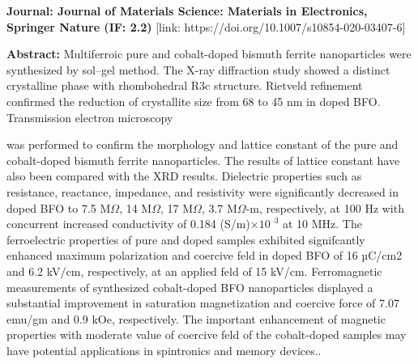 \documentclass[a4paper,20pt]{article}
\begin{document}
\textbf{Journal: Journal of Materials Science: Materials in Electronics, Springer Nature (IF: 2.2)} [link: https://doi.org/10.1007/s10854-020-03407-6] \\ \vspace{10pt}

\textbf{Abstract:} Multiferroic pure and cobalt-doped bismuth ferrite nanoparticles were synthesized by sol–gel method. The X-ray diffraction study showed a distinct crystalline phase with rhombohedral R3c structure. Rietveld refinement confirmed the reduction of crystallite size from 68 to 45 nm in doped BFO. Transmission electron microscopy \\ \vspace{2pt}

    \begin{minipage}{.59\linewidth} \begin{flushleft}
    
    	  was performed to confirm the morphology and lattice constant of the pure and cobalt-doped bismuth ferrite nanoparticles. The results of lattice constant have also been compared with the XRD results. Dielectric properties such as resistance, reactance, impedance, and resistivity were significantly decreased in doped BFO to 7.5 M$\Omega$, 14 M$\Omega$, 17 M$\Omega$, 3.7 M$\Omega$-m, respectively, at 100 Hz with concurrent increased conductivity of 0.184 (S/m)×${10}^{–3}$ at 10 MHz. The ferroelectric properties of pure and doped samples exhibited signifcantly enhanced maximum polarization and coercive feld in doped BFO of 16 µC/cm2 and 6.2 kV/cm, respectively, at an applied feld of 15 kV/cm. Ferromagnetic measurements of synthesized cobalt-doped BFO nanoparticles displayed a substantial improvement in saturation magnetization and coercive force of 7.07 emu/gm and 0.9 kOe, respectively. The important enhancement of magnetic properties with moderate value of coercive feld of the cobalt-doped samples may have potential applications in spintronics and memory devices.. 
    	\end{flushleft} \end{minipage}
    \hfill 
\end{document}
